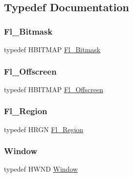\subsection{Typedef Documentation}
\mbox{\label{win32_8_h_a8a0c688d4070b7b0091480b3e090b7ca}} 
\subsubsection{\texorpdfstring{Fl\+\_\+\+Bitmask}{Fl\_Bitmask}}
{\footnotesize\ttfamily typedef H\+B\+I\+T\+M\+AP \hyperlink{mac_8_h_a90133b6f8cfb11ab81d83b2c4d91310d}{Fl\+\_\+\+Bitmask}}

\mbox{\label{win32_8_h_af5e0de85904490a21618c8cffb95b79b}} 
\subsubsection{\texorpdfstring{Fl\+\_\+\+Offscreen}{Fl\_Offscreen}}
{\footnotesize\ttfamily typedef H\+B\+I\+T\+M\+AP \hyperlink{mac_8_h_ad24d9679e17ea5ffa910ed355d4df340}{Fl\+\_\+\+Offscreen}}

\mbox{\label{win32_8_h_a9c2426561f9bee9822474993f2784329}} 
\subsubsection{\texorpdfstring{Fl\+\_\+\+Region}{Fl\_Region}}
{\footnotesize\ttfamily typedef H\+R\+GN \hyperlink{mac_8_h_ac80c9f95cc93c989c5a953a749f45cb6}{Fl\+\_\+\+Region}}

\mbox{\label{win32_8_h_adb48baf8a5c3aa4e6bdb2ca8112f5492}} 
\subsubsection{\texorpdfstring{Window}{Window}}
{\footnotesize\ttfamily typedef H\+W\+ND \hyperlink{mac_8_h_a213656d363e884b651cc92f58e863fc6}{Window}}

